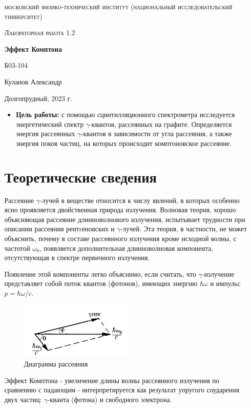 \documentclass[a4paper, 12pt]{article}
\begin{document}
\begin{titlepage}
	\centering
	\vspace{5cm}
	{\scshape\LARGE московский физико-технический институт (национальный исследовательский университет) \par}
	\vspace{6cm}
	{\scshape\Large Лабораторная работа 1.2 \par}
	{\huge\bfseries Эффект Комптона \par}
	\vspace{1cm}
	\vfill
\begin{flushright}
	{\large Б03-104}\par
	\vspace{0.3cm}
	{\LARGE Куланов Александр}
\end{flushright}
	

	\vfill


	Долгопрудный, 2023 г.
\end{titlepage}

\begin{itemize}
	\item \textbf{Цель работы:}  с помощью сцинтилляционного спектрометра исследуется энергетический спектр $\gamma$-квантов, рассеянных на графите. Определяется энергия рассеянных $\gamma$-квантов в зависимости от угла рассеяния, а также энергия покоя частиц, на которых происходит комптоновское рассеяние.
\end{itemize}

\section{Теоретические сведения}

Рассеяние $\gamma$-лучей в веществе относится к числу явлений, в которых особенно ясно проявляется двойственная природа излучения. Волновая теория, хорошо объясняющая рассеяние длинноволнового излучения, испытывает трудности при описании рассеяния рентrеновских и $\gamma$-лучей. Эта теория, в частности, не может объяснить, почему в составе рассеянного излучения кроме исходной волны, с частотой $\omega_0$, появляется дополнительная длинноволновая компонента, отсутствующая в спектре первичного излучения.

Появление этой компоненты легко объяснимо, если считать, что $\gamma$-излучение представляет собой поток квантов (фотонов), имеющих энергию $\hbar \omega$ и импульс $p=\hbar \omega / c$. 
\begin{figure}[H]
    \centering
    \includegraphics[width=0.5\textwidth]{diagr.jpg}
    \caption{Диаграмма рассеяния}
    \label{fig:diagr}
\end{figure}
Эффект Комптона - увеличение длины волны рассеянного излучения по сравнению с падающим - интерпретируется как результат упругого соударения двух частиц: $\gamma$-кванта (фотона) и свободного электрона.
\end{document}
